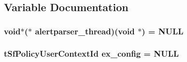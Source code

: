 \subsection{Variable Documentation}
\hypertarget{group__spp__ai_gaa3100e48acef5cf4370c3042ff548ed0}{
\subsubsection[{alertparser\_\-thread}]{\setlength{\rightskip}{0pt plus 5cm}void$\ast$($\ast$ {\bf alertparser\_\-thread})(void $\ast$) = NULL}}
\label{group__spp__ai_gaa3100e48acef5cf4370c3042ff548ed0}
\hypertarget{group__spp__ai_ga3dd75596c540d148643fe6d1fdc02628}{
\subsubsection[{ex\_\-config}]{\setlength{\rightskip}{0pt plus 5cm}tSfPolicyUserContextId {\bf ex\_\-config} = NULL}}
\label{group__spp__ai_ga3dd75596c540d148643fe6d1fdc02628}
